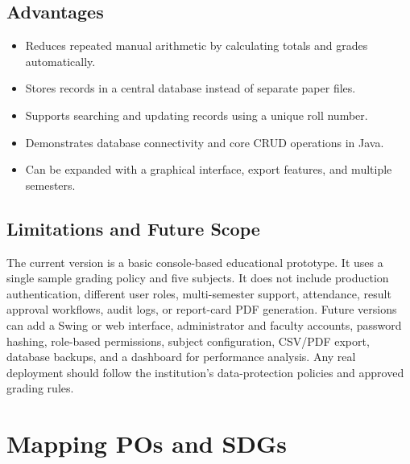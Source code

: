 \documentclass[11pt,a4paper]{report}
\begin{document}
\subsection{Advantages}
\begin{itemize}
\item Reduces repeated manual arithmetic by calculating totals and grades automatically.
\item Stores records in a central database instead of separate paper files.
\item Supports searching and updating records using a unique roll number.
\item Demonstrates database connectivity and core CRUD operations in Java.
\item Can be expanded with a graphical interface, export features, and multiple semesters.
\end{itemize}

\subsection{Limitations and Future Scope}
The current version is a basic console-based educational prototype. It uses a single sample grading policy and five subjects. It does not include production authentication, different user roles, multi-semester support, attendance, result approval workflows, audit logs, or report-card PDF generation. Future versions can add a Swing or web interface, administrator and faculty accounts, password hashing, role-based permissions, subject configuration, CSV/PDF export, database backups, and a dashboard for performance analysis. Any real deployment should follow the institution's data-protection policies and approved grading rules.

\section{Mapping POs and SDGs}
\end{document}
